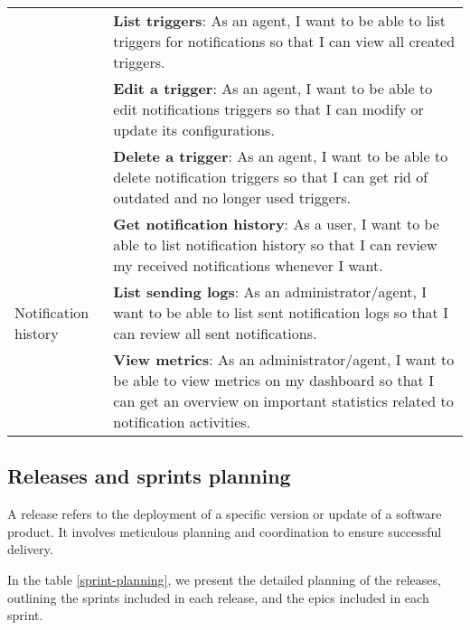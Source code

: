 \begin{longtable}{ | m{}  | m{} | }
      \cline{2-2}
                                                              & \textbf{List triggers}: As an agent, I want to be able to list triggers for notifications so that I can view all created triggers.                                                            \\
      \cline{2-2}
                                                              & \textbf{Edit a trigger}: As an agent, I want to be able to edit notifications triggers so that I can modify or update its configurations.                                                     \\
      \cline{2-2}
                                                              & \textbf{Delete a trigger}: As an agent, I want to be able to delete notification triggers so that I can get rid of outdated and no longer used triggers.                                      \\
      \hline
      \multirow[t]{4}{5em}{Notification history}              & \textbf{Get notification history}: As a user, I want to be able to list notification history so that I can review my received notifications whenever I want.                                  \\
      \cline{2-2}
                                                              & \textbf{List sending logs}: As an administrator/agent, I want to be able to list sent notification logs so that I can review all sent notifications.                                          \\
      \hline
      Dashboard                                               & \textbf{View metrics}: As an administrator/agent, I want to be able to view metrics on my dashboard so that I can get an overview on important statistics related to notification activities. \\
      \hline
\end{longtable}

\subsection{Releases and sprints planning}
A release refers to the deployment of a specific version or update of a software product. It involves meticulous planning
and coordination to ensure successful delivery.

In the table \ref{sprint-planning}, we present the detailed planning of the releases, outlining the sprints included in each release,
and the epics included in each sprint.


